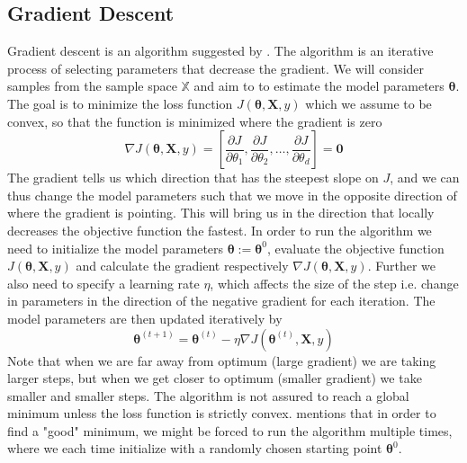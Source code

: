 \subsection{Gradient Descent} 
Gradient descent is an algorithm suggested by \cite{Cauchy1847}. The algorithm is an iterative process of selecting parameters that decrease the gradient. We will consider samples from the sample space $\mathbb{X}$ and aim to to estimate the model parameters $\boldsymbol{\theta}$. The goal is to minimize the loss function  $J(\boldsymbol{\theta},\boldsymbol{X},y)$ which we assume to be convex, so that the function is minimized where the gradient is zero
\begin{equation*}
    \nabla J(\boldsymbol{\theta},\boldsymbol{X},y)=\left[\frac{\partial J}{\partial\theta_1},\frac{\partial J}{\partial\theta_2},\ldots,\frac{\partial J}{\partial\theta_d}\right]=\boldsymbol{0}
\end{equation*}
The gradient tells us which direction that has the steepest slope on $J$, and we can thus change the model parameters such that we move in the opposite direction of where the gradient is pointing. This will bring us in the direction that locally decreases the objective function the fastest. In order to run the algorithm we need to initialize the model parameters $\boldsymbol{\theta}:=\boldsymbol{\theta}^0$, evaluate the objective function $J(\boldsymbol{\theta},\boldsymbol{X},y)$ and calculate the gradient respectively $\nabla J(\boldsymbol{\theta},\boldsymbol{X},y)$. Further we also need to specify a learning rate $\eta$, which affects the size of the step i.e. change in parameters in the direction of the negative gradient for each iteration. The model parameters are then updated iteratively by
\begin{equation*}
    \boldsymbol{\theta}^{(t+1)}=\boldsymbol{\theta}^{(t)}-\eta \nabla J(\boldsymbol{\theta}^{(t)},\boldsymbol{X},y)
\end{equation*}
Note that when we are far away from optimum (large gradient) we are taking larger steps, but when we get closer to optimum (smaller gradient) we take smaller and smaller steps. The algorithm is not assured to reach a global minimum unless the loss function is strictly convex. \cite{bishop2007} mentions that in order to find a "good" minimum, we might be forced to run the algorithm multiple times, where we each time initialize with a randomly chosen starting point $\boldsymbol{\theta}^0$. 

